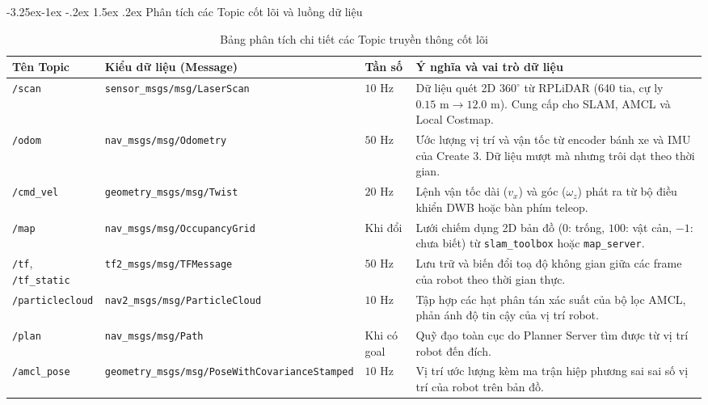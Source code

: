 \documentclass[11pt,a4paper]{article}
\makeatletter
\renewcommand{\subsection}{\@startsection{subsection}{2}{\z@}%
  {-3.25ex\@plus -1ex \@minus -.2ex}%
  {1.5ex \@plus .2ex}%
  {\normalfont\large\bfseries\color{secondary}}}
\makeatother
\begin{document}
\subsection{Phân tích các Topic cốt lõi và luồng dữ liệu}
\begin{table}[H]
\centering
\small
\begin{tabularx}{\textwidth}{p{2.6cm}p{4.8cm}p{1.4cm}X}
\toprule
\textbf{\color{primary}Tên Topic} & \textbf{\color{primary}Kiểu dữ liệu (Message)} & \textbf{\color{primary}Tần số} & \textbf{\color{primary}Ý nghĩa và vai trò dữ liệu} \\
\midrule
\texttt{/scan} & \scriptsize\texttt{sensor\_msgs/msg/LaserScan} & $10\text{ Hz}$ & Dữ liệu quét 2D $360^\circ$ từ RPLiDAR (640 tia, cự ly $0.15\text{ m} \to 12.0\text{ m}$). Cung cấp cho SLAM, AMCL và Local Costmap. \\
\rowcolor{boxbg}
\texttt{/odom} & \scriptsize\texttt{nav\_msgs/msg/Odometry} & $50\text{ Hz}$ & Ước lượng vị trí và vận tốc từ encoder bánh xe và IMU của Create 3. Dữ liệu mượt mà nhưng trôi dạt theo thời gian. \\
\texttt{/cmd\_vel} & \scriptsize\texttt{geometry\_msgs/msg/Twist} & $20\text{ Hz}$ & Lệnh vận tốc dài ($v_x$) và góc ($\omega_z$) phát ra từ bộ điều khiển DWB hoặc bàn phím teleop. \\
\rowcolor{boxbg}
\texttt{/map} & \scriptsize\texttt{nav\_msgs/msg/OccupancyGrid} & Khi đổi & Lưới chiếm dụng 2D bản đồ ($0$: trống, $100$: vật cản, $-1$: chưa biết) từ \texttt{slam\_toolbox} hoặc \texttt{map\_server}. \\
\texttt{/tf}, \texttt{/tf\_static} & \scriptsize\texttt{tf2\_msgs/msg/TFMessage} & $50\text{ Hz}$ & Lưu trữ và biến đổi toạ độ không gian giữa các frame của robot theo thời gian thực. \\
\rowcolor{boxbg}
\texttt{/particlecloud} & \scriptsize\texttt{nav2\_msgs/msg/ParticleCloud} & $10\text{ Hz}$ & Tập hợp các hạt phân tán xác suất của bộ lọc AMCL, phản ánh độ tin cậy của vị trí robot. \\
\texttt{/plan} & \scriptsize\texttt{nav\_msgs/msg/Path} & Khi có goal & Quỹ đạo toàn cục do Planner Server tìm được từ vị trí robot đến đích. \\
\rowcolor{boxbg}
\texttt{/amcl\_pose} & \scriptsize\texttt{geometry\_msgs/msg/PoseWithCovarianceStamped} & $10\text{ Hz}$ & Vị trí ước lượng kèm ma trận hiệp phương sai sai số vị trí của robot trên bản đồ. \\
\bottomrule
\end{tabularx}
\caption{Bảng phân tích chi tiết các Topic truyền thông cốt lõi}
\label{tab:topics}
\end{table}
\end{document}
